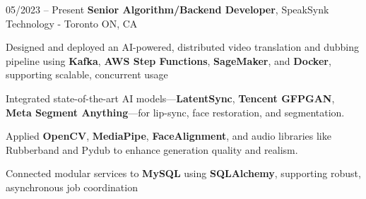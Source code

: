 \begin{twocolentry}{
    05/2023 – Present
}
\fontsize{11 pt}{11 pt}\textbf{Senior Algorithm/Backend Developer}, SpeakSynk Technology - Toronto ON, CA\end{twocolentry}

\vspace{0.10 cm}
\begin{onecolentry}
    \begin{highlights}
        \item Designed and deployed an AI-powered, distributed video translation and dubbing pipeline using \textbf{Kafka}, \newline \textbf{AWS Step Functions}, \textbf{SageMaker}, and \textbf{Docker}, supporting scalable, concurrent usage
        \item Integrated state-of-the-art AI models—\textbf{LatentSync}, \textbf{Tencent GFPGAN}, \textbf{Meta Segment Anything}—for lip-sync, face restoration, and segmentation.
        \item Applied \textbf{OpenCV}, \textbf{MediaPipe}, \textbf{FaceAlignment}, and audio libraries like Rubberband and Pydub to enhance generation quality and realism.
        \item Connected modular services to \textbf{MySQL} using \textbf{SQLAlchemy}, supporting robust, asynchronous job coordination
    \end{highlights}
\end{onecolentry}

